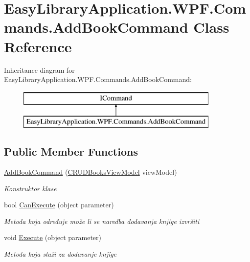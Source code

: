 \hypertarget{class_easy_library_application_1_1_w_p_f_1_1_commands_1_1_add_book_command}{}\section{Easy\+Library\+Application.\+W\+P\+F.\+Commands.\+Add\+Book\+Command Class Reference}
\label{class_easy_library_application_1_1_w_p_f_1_1_commands_1_1_add_book_command}
Inheritance diagram for Easy\+Library\+Application.\+W\+P\+F.\+Commands.\+Add\+Book\+Command\+:\begin{figure}[H]
\begin{center}
\leavevmode
\includegraphics[height=2.000000cm]{class_easy_library_application_1_1_w_p_f_1_1_commands_1_1_add_book_command}
\end{center}
\end{figure}
\subsection*{Public Member Functions}
\begin{DoxyCompactItemize}
\item 
\mbox{\hyperlink{class_easy_library_application_1_1_w_p_f_1_1_commands_1_1_add_book_command_a5e065e2fd4b8b98488cb2ebd6c89f888}{Add\+Book\+Command}} (\mbox{\hyperlink{class_easy_library_application_1_1_w_p_f_1_1_view_model_1_1_c_r_u_d_books_view_model}{C\+R\+U\+D\+Books\+View\+Model}} view\+Model)
\begin{DoxyCompactList}\small\item\em Konstruktor klase \end{DoxyCompactList}\item 
bool \mbox{\hyperlink{class_easy_library_application_1_1_w_p_f_1_1_commands_1_1_add_book_command_a4cd06561300961ece2adb98c27d50425}{Can\+Execute}} (object parameter)
\begin{DoxyCompactList}\small\item\em Metoda koja određuje može li se naredba dodavanja knjige izvršiti \end{DoxyCompactList}\item 
void \mbox{\hyperlink{class_easy_library_application_1_1_w_p_f_1_1_commands_1_1_add_book_command_ade8f62a72da7914cfc8b47d0e20ca88c}{Execute}} (object parameter)
\begin{DoxyCompactList}\small\item\em Metoda koja služi za dodavanje knjige \end{DoxyCompactList}\end{DoxyCompactItemize}
